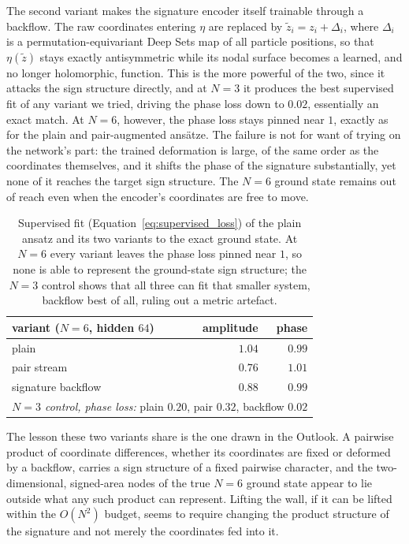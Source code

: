 \documentclass[a4paper,11pt,twoside]{article}
\begin{document}
The second variant makes the signature encoder itself trainable through a backflow. The raw coordinates entering $\eta$ are replaced by $\tilde z_i = z_i + \Delta_i$, where $\Delta_i$ is a permutation-equivariant Deep Sets map of all particle positions, so that $\eta(\tilde z)$ stays exactly antisymmetric while its nodal surface becomes a learned, and no longer holomorphic, function. This is the more powerful of the two, since it attacks the sign structure directly, and at $N=3$ it produces the best supervised fit of any variant we tried, driving the phase loss down to $0.02$, essentially an exact match. At $N=6$, however, the phase loss stays pinned near $1$, exactly as for the plain and pair-augmented ansätze. The failure is not for want of trying on the network's part: the trained deformation is large, of the same order as the coordinates themselves, and it shifts the phase of the signature substantially, yet none of it reaches the target sign structure. The $N=6$ ground state remains out of reach even when the encoder's coordinates are free to move.

\begin{table}[H]
    \centering
    \begin{tabular}{l r r}
        \hline
        variant ($N=6$, hidden $64$) & amplitude & phase \\
        \hline
        plain              & $1.04$ & $0.99$ \\
        pair stream        & $0.76$ & $1.01$ \\
        signature backflow & $0.88$ & $0.99$ \\
        \hline
        \multicolumn{3}{l}{\emph{$N=3$ control, phase loss:} plain $0.20$, pair $0.32$, backflow $\mathbf{0.02}$} \\
        \hline
    \end{tabular}
    \caption{Supervised fit (Equation~\ref{eq:supervised_loss}) of the plain ansatz and its two variants to the exact ground state. At $N=6$ every variant leaves the phase loss pinned near $1$, so none is able to represent the ground-state sign structure; the $N=3$ control shows that all three can fit that smaller system, backflow best of all, ruling out a metric artefact.}
    \label{tab:variants}
\end{table}

The lesson these two variants share is the one drawn in the Outlook. A pairwise product of coordinate differences, whether its coordinates are fixed or deformed by a backflow, carries a sign structure of a fixed pairwise character, and the two-dimensional, signed-area nodes of the true $N=6$ ground state appear to lie outside what any such product can represent. Lifting the wall, if it can be lifted within the $O(N^2)$ budget, seems to require changing the product structure of the signature and not merely the coordinates fed into it.



\end{document}
